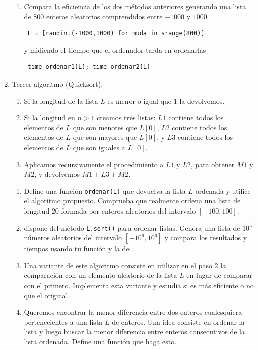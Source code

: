 \begin{enumerate}
\begin{ejer}
\begin{enumerate}
\item Compara la eficiencia de los dos m\'etodos anteriores generando una lista
de $800$
enteros aleatorios comprendidos entre $-1000$ y $1000$
\begin{lstlisting}
 L = [randint(-1000,1000) for muda in srange(800)]
\end{lstlisting}
y midiendo el tiempo que
el ordenador tarda en ordenarlas
\begin{lstlisting}
 time ordenar1(L); time ordenar2(L)
\end{lstlisting}
\end{enumerate} 
\end{ejer}
\item \label{quicksort} {\sc Tercer algoritmo (Quicksort):}

\begin{enumerate}
 \item    Si la longitud de la lista $L$ es menor o igual que $1$ la devolvemos.
 \item    Si la longitud en $n>1$ creamos tres listas: $L1$ contiene todos los
elementos de $L$ que son menores que $L[0]$, $L2$ contiene todos los elementos
de $L$ que son mayores que $L[0]$, y $L3$ contiene todos los elementos de $L$
que son iguales a $L[0]$.
 \item    Aplicamos recursivamente el procedimiento a $L1$ y $L2$,  para obtener
$M1$ y $M2$, y devolvemos $M1+L3+M2.$

\end{enumerate}

\begin{ejer}
\begin{enumerate}
\item Define una función \lstinline$ordenar(L)$ que devuelva la lista $L$
ordenada y utilice el algoritmo propuesto. Comprueba que realmente ordena una
lista 
de longitud $20$ formada por enteros aleatorios del intervalo $[-100,100].$
\item {\sage} dispone del método \lstinline$L.sort()$ para ordenar listas.
Genera una lista de $10^5$ números aleatorios del intervalo $[-10^6,10^6]$ y
compara 
los resultados y tiempos usando tu función y la de {\sage}. 
 \item    Una variante de este algoritmo consiste en utilizar en el paso $2$ la
comparación con un elemento aleatorio de la lista $L$ en lugar de comparar con
el primero.  Implementa esta variante y estudia si es más eficiente o no que el
original.
 \item    Queremos encontrar la menor diferencia entre dos enteros cualesquiera
pertenecientes a una lista $L$ de enteros. Una idea consiste en  ordenar la
lista y luego buscar la menor diferencia entre enteros consecutivos de la lista
ordenada. Define una función que haga esto.


\end{enumerate}
\end{ejer}
\end{enumerate}
